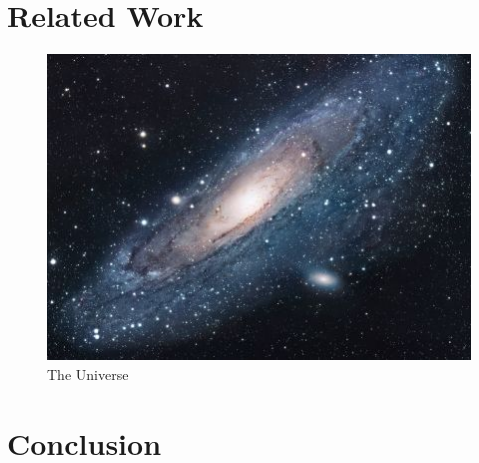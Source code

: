 \documentclass[a4paper,12pt]{article}
\begin{document}
\section{Related Work}



\begin{figure}[h!]
\centering
\includegraphics[scale=1.7]{universe}
\caption{The Universe}
\label{fig:universe}
\end{figure}

\section{Conclusion}

\printbibliography
\end{document}

